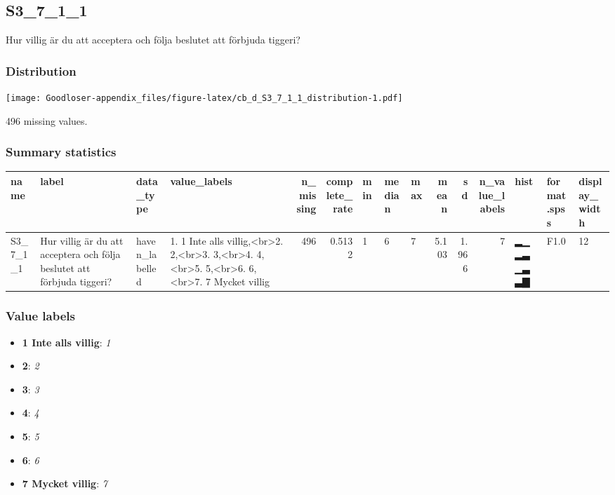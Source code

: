 \documentclass[
]{book}
\providecommand{\tightlist}{%
  \setlength{\itemsep}{0pt}\setlength{\parskip}{0pt}}
\begin{document}
\hypertarget{S3_7_1_1}{%
\subsection{S3\_7\_1\_1}\label{S3_7_1_1}}

Hur villig är du att acceptera och följa beslutet att förbjuda tiggeri?

\hypertarget{S3_7_1_1_distribution}{%
\subsubsection{Distribution}\label{S3_7_1_1_distribution}}

\texttt{[image: Goodloser-appendix\_files/figure-latex/cb\_d\_S3\_7\_1\_1\_distribution-1.pdf]}

496 missing values.

\hypertarget{S3_7_1_1_summary}{%
\subsubsection{Summary statistics}\label{S3_7_1_1_summary}}

\begin{tabular}{l|l|l|l|r|r|l|l|l|r|r|r|l|l|l}
\hline
name & label & data_type & value_labels & n_missing & complete_rate & min & median & max & mean & sd & n_value_labels & hist & format.spss & display_width\\
\hline
S3_7_1_1 & Hur villig är du att acceptera och följa beslutet att förbjuda tiggeri? & haven_labelled & 1. 1 Inte alls villig,<br>2. 2,<br>3. 3,<br>4. 4,<br>5. 5,<br>6. 6,<br>7. 7 Mycket villig & 496 & 0.5132 & 1 & 6 & 7 & 5.103 & 1.966 & 7 & ▂▁▂▃▁▃▃▇ & F1.0 & 12\\
\hline
\end{tabular}

\hypertarget{S3_7_1_1_labels}{%
\subsubsection{Value labels}\label{S3_7_1_1_labels}}

\begin{itemize}
\tightlist
\item
  \textbf{1 Inte alls villig}: \emph{1}
\item
  \textbf{2}: \emph{2}
\item
  \textbf{3}: \emph{3}
\item
  \textbf{4}: \emph{4}
\item
  \textbf{5}: \emph{5}
\item
  \textbf{6}: \emph{6}
\item
  \textbf{7 Mycket villig}: \emph{7}
\end{itemize}
\end{document}
